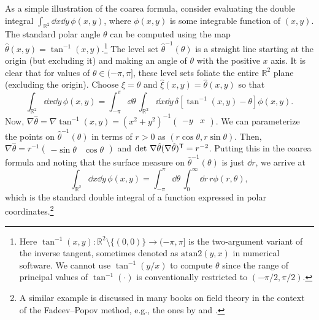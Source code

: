 \begin{example}
  As a simple illustration of the coarea formula, consider evaluating the double integral $\int_{\mathbb{R}^{2}} \dd{x}\dd{y}\, \phi(x,y)$, where $\phi(x, y)$ is some integrable function of $(x, y)$.
  The standard polar angle $\theta$ can be computed using the map $\hat{\theta}(x, y) = \tan^{-1}(x, y)$.\footnote{Here $\tan^{-1}(x, y): \mathbb{R}^{2} \setminus \{(0,0)\} \to (-\pi, \pi]$ is the two-argument variant of the inverse tangent, sometimes denoted as $\mathrm{atan2}(y, x)$ in numerical software.  We cannot use $\tan^{-1}(y/x)$ to compute $\theta$ since the range of principal values of $\tan^{-1}(\cdot)$ is conventionally restricted to $(-\pi/2, \pi/2)$.}
  The level set $\hat{\theta}^{-1}(\theta)$ is a straight line starting at the origin (but excluding it) and making an angle of $\theta$ with the positive $x$ axis.
  It is clear that for values of $\theta \in (-\pi, \pi]$, these level sets foliate the entire $\mathbb{R}^{2}$ plane (excluding the origin).
  Choose $\xi = \theta$ and $\hat{\xi}(x, y) = \hat{\theta}(x, y)$ so that
  \begin{equation}
    \int_{\mathbb{R}^{2}} \dd{x}\dd{y}\, \phi(x, y) = \int_{-\pi}^{\pi} \dd\theta\, \int_{\mathbb{R}^{2}} \dd{x}\dd{y}\, \delta[\tan^{-1}(x, y) - \theta] \phi(x, y).
  \end{equation}
  Now, $\nabla\hat{\theta} = \nabla\tan^{-1}(x, y) = (x^{2} + y^{2})^{-1}\begin{pmatrix}-y & x\end{pmatrix}$.
  We can parameterize the points on $\hat{\theta}^{-1}(\theta)$ in terms of $r > 0$ as $(r\cos{\theta}, r\sin{\theta})$.
  Then, $\nabla\hat{\theta} = r^{-1}\begin{pmatrix}-\sin\theta & \cos\theta\end{pmatrix}$ and $\det\,\nabla\hat{\theta}(\nabla\hat{\theta})^\mathsf{T} = r^{-2}$.
  Putting this in the coarea formula and noting that the surface measure on $\hat{\theta}^{-1}(\theta)$ is just $\dd{r}$, we arrive at
  \begin{equation}
    \int_{\mathbb{R}^{2}} \dd{x}\dd{y}\, \phi(x, y) = \int_{-\pi}^{\pi} \dd\theta\, \int_0^{\infty} \dd{r}\, r \phi(r, \theta),
  \end{equation}
  which is the standard double integral of a function expressed in polar coordinates.\footnote{A similar example is discussed in many books on field theory in the context of the Fadeev--Popov method, e.g., the ones by \citet[Section 7.2]{ryder1996} and \citet[Part III.4]{zee2010}.}
  \altqed
\end{example}

